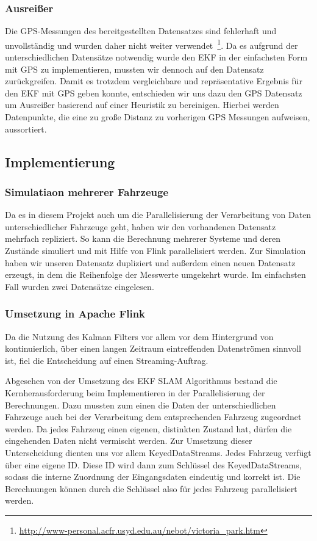 \documentclass[11pt]{article}
\begin{document}
\subsubsection{Ausreißer}
Die GPS-Messungen des bereitgestellten Datensatzes sind fehlerhaft und unvollständig und wurden daher nicht weiter verwendet~\footnote{\url{http://www-personal.acfr.usyd.edu.au/nebot/victoria_park.htm}}. Da es aufgrund der unterschiedlichen Datensätze notwendig wurde den EKF in der einfachsten Form mit GPS zu implementieren, mussten wir dennoch auf den Datensatz zurückgreifen. Damit es trotzdem vergleichbare und repräsentative Ergebnis für den EKF mit GPS geben konnte, entschieden wir uns dazu den GPS Datensatz um Ausreißer basierend auf einer Heuristik zu bereinigen. Hierbei werden Datenpunkte, die eine zu große Distanz zu vorherigen GPS Messungen aufweisen, aussortiert.

\subsection{Implementierung}\label{Implementierung}

\subsubsection{Simulatiaon mehrerer Fahrzeuge}
Da es in diesem Projekt auch um die Parallelisierung der Verarbeitung von Daten unterschiedlicher Fahrzeuge geht, haben wir den vorhandenen Datensatz mehrfach repliziert. So kann die Berechnung mehrerer Systeme und deren Zustände simuliert und mit Hilfe von Flink parallelisiert werden. Zur Simulation haben wir unseren Datensatz dupliziert und außerdem einen neuen Datensatz erzeugt, in dem die Reihenfolge der Messwerte umgekehrt wurde. Im einfachsten Fall wurden zwei Datensätze eingelesen.

\subsubsection{Umsetzung in Apache Flink}
Da die Nutzung des Kalman Filters vor allem vor dem Hintergrund von kontinuierlich, über einen langen Zeitraum eintreffenden Datenströmen sinnvoll ist, fiel die Entscheidung auf einen Streaming-Auftrag.

Abgesehen von der Umsetzung des EKF SLAM Algorithmus bestand die Kernherausforderung beim Implementieren in der Parallelisierung der Berechnungen. Dazu mussten zum einen die Daten der unterschiedlichen Fahrzeuge auch bei der Verarbeitung dem entsprechenden Fahrzeug zugeordnet werden. Da jedes Fahrzeug einen eigenen, distinkten Zustand hat, dürfen die eingehenden Daten nicht vermischt werden. Zur Umsetzung dieser Unterscheidung dienten uns vor allem KeyedDataStreams. Jedes Fahrzeug verfügt über eine eigene ID. Diese ID wird dann zum Schlüssel des KeyedDataStreams, sodass die interne Zuordnung der Eingangsdaten eindeutig und korrekt ist. Die Berechnungen können durch die Schlüssel also für jedes Fahrzeug parallelisiert werden.
\end{document}
